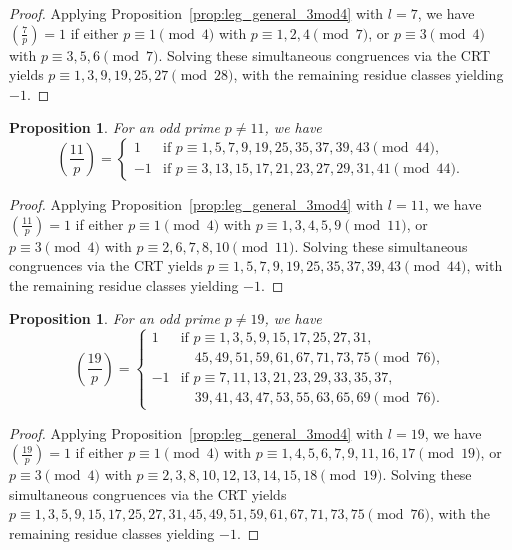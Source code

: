 \documentclass[11pt,a4paper]{amsart}
\theoremstyle{plain}
\newtheorem{proposition}[theorem]{Proposition}
\theoremstyle{definition}
\begin{document}
\begin{proof}
Applying Proposition~\ref{prop:leg_general_3mod4} with $l=7$, we have $\left(\frac{7}{p}\right) = 1$ if either $p \equiv 1 \pmod 4$ with $p \equiv 1, 2, 4 \pmod 7$, or $p \equiv 3 \pmod 4$ with $p \equiv 3, 5, 6 \pmod 7$. Solving these simultaneous congruences via the CRT yields $p \equiv 1, 3, 9, 19, 25, 27 \pmod{28}$, with the remaining residue classes yielding $-1$.
\end{proof}
\begin{proposition}\label{prop:leg11}
For an odd prime $p \neq 11$, we have
\[
\left(\frac{11}{p}\right) = 
\begin{cases}
    1 & \text{if } p \equiv 1, 5, 7, 9, 19, 25, 35, 37, 39, 43 \pmod{44}, \\
    -1 & \text{if } p \equiv 3, 13, 15, 17, 21, 23, 27, 29, 31, 41 \pmod{44}.
\end{cases}
\]\end{proposition}
\begin{proof}
Applying Proposition~\ref{prop:leg_general_3mod4} with $l=11$, we have $\left(\frac{11}{p}\right) = 1$ if either $p \equiv 1 \pmod 4$ with $p \equiv 1, 3, 4, 5, 9 \pmod{11}$, or $p \equiv 3 \pmod 4$ with $p \equiv 2, 6, 7, 8, 10 \pmod{11}$. Solving these simultaneous congruences via the CRT yields $p \equiv 1, 5, 7, 9, 19, 25, 35, 37, 39, 43 \pmod{44}$, with the remaining residue classes yielding $-1$.
\end{proof}
\begin{proposition}\label{prop:leg19}
For an odd prime $p \neq 19$, we have
\[
\left(\frac{19}{p}\right) = 
\begin{cases} 
    1 & \text{if } p \equiv 1, 3, 5, 9, 15, 17, 25, 27, 31, \\
      & \quad 45, 49, 51, 59, 61, 67, 71, 73, 75 \pmod{76}, \\ 
    -1 & \text{if } p \equiv 7, 11, 13, 21, 23, 29, 33, 35, 37, \\
       & \quad 39, 41, 43, 47, 53, 55, 63, 65, 69 \pmod{76}. 
\end{cases}
\]
\end{proposition}
\begin{proof}
Applying Proposition~\ref{prop:leg_general_3mod4} with $l=19$, we have $\left(\frac{19}{p}\right) = 1$ if either $p \equiv 1 \pmod 4$ with $p \equiv 1, 4, 5, 6, 7, 9, \allowbreak 11, 16, 17 \pmod{19}$, or $p \equiv 3 \pmod 4$ with $p \equiv 2, 3, 8, 10, 12, \allowbreak 13, 14, 15, 18 \pmod{19}$. Solving these simultaneous congruences via the CRT yields $p \equiv 1, 3, 5, 9, 15, 17, \allowbreak 25, 27, 31, 45, 49, 51, \allowbreak 59, 61, 67, 71, 73, 75 \pmod{76}$, with the remaining residue classes yielding $-1$.
\end{proof}
\end{document}
